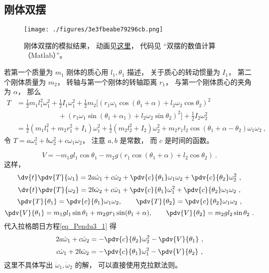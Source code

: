 \subsection{刚体双摆}

\begin{figure}[ht]
\centering
\texttt{[image: ./figures/3e3fbeabe79296cb.png]}
\caption{刚体双摆的模拟结果， 动画见\href{https://wuli.wiki/apps/RigDbPend.html}{这里}， 代码见 “双摆的数值计算（Matlab）”。} \label{fig_Pendu3_4}
\end{figure}
若第一个质量为 $m_1$ 刚体的质心用 $l_1,\theta_1$ 描述， 关于质心的转动惯量为 $I_1$， 第二个刚体质量为 $m_2$， 转轴与第一个刚体的转轴距离 $r_1$， 与第一个刚体质心的夹角为 $\alpha$， 那么
\begin{equation}
\begin{aligned}
T &= \frac{1}{2}m_1 l_1^2 \omega_1^2 + \frac{1}{2}I_1 \omega_1^2
 + \frac{1}{2}m_2[(r_1\omega_1\cos(\theta_1 + \alpha) + l_2\omega_2\cos\theta_2)^2\\
&\qquad \qquad \qquad+ (r_1\omega_1\sin(\theta_1+\alpha_1) + l_2\omega_2\sin\theta_2)^2] + \frac{1}{2}I_2\omega_2^2\\
&= \frac{1}{2}(m_1l_1^2 + m_2r_1^2 + I_1)\omega_1^2 + \frac{1}{2}(m_2l_2^2 + I_2)\omega_2^2 + m_2r_1l_2\cos(\theta_1+\alpha-\theta_2)\omega_1\omega_2~,
\end{aligned}
\end{equation}
令 $T = a\omega_1^2 + b\omega_2^2 + c\omega_1\omega_2$， 注意 $a,b$ 是常数， 而 $c$ 是时间的函数。

\begin{equation}  
V = -m_1 g l_1 \cos \theta_1 - m_2 g (r_1\cos(\theta_1 + \alpha) + l_2 \cos \theta_2)~.
\end{equation}
这样，
\begin{equation}
\dv{t}\pdv{T}{\omega_1} = 2a\dot\omega_1 + c\dot\omega_2 + \pdv{c}{\theta_1}\omega_1\omega_2 + \pdv{c}{\theta_2}\omega_2^2~,
\end{equation}
\begin{equation}
\dv{t}\pdv{T}{\omega_2} = 2b\dot\omega_2 + c\dot\omega_1 + \pdv{c}{\theta_1}\omega_1^2 + \pdv{c}{\theta_2}\omega_1\omega_2~,
\end{equation}
\begin{equation}
\pdv{T}{\theta_1} = \pdv{c}{\theta_1}\omega_1\omega_2, \qquad
\pdv{T}{\theta_2} = \pdv{c}{\theta_2}\omega_1\omega_2~,
\end{equation}
\begin{equation}
\pdv{V}{\theta_1} = m_1gl_1\sin\theta_1 + m_2gr_1\sin(\theta_1+\alpha), \qquad
\pdv{V}{\theta_2} = m_2gl_2\sin\theta_2~.
\end{equation}
代入拉格朗日方程\autoref{eq_Pendu3_1} 得
\begin{equation}
2a\dot\omega_1 + c\dot\omega_2 = -\pdv{c}{\theta_2}\omega_2^2 - \pdv{V}{\theta_1}~,
\end{equation}
\begin{equation}
c\dot\omega_1 + 2b\dot\omega_2 = -\pdv{c}{\theta_1}\omega_1^2 - \pdv{V}{\theta_2}~,
\end{equation}
这里不具体写出 $\dot\omega_1, \dot\omega_2$ 的解， 可以直接使用克拉默法则。

